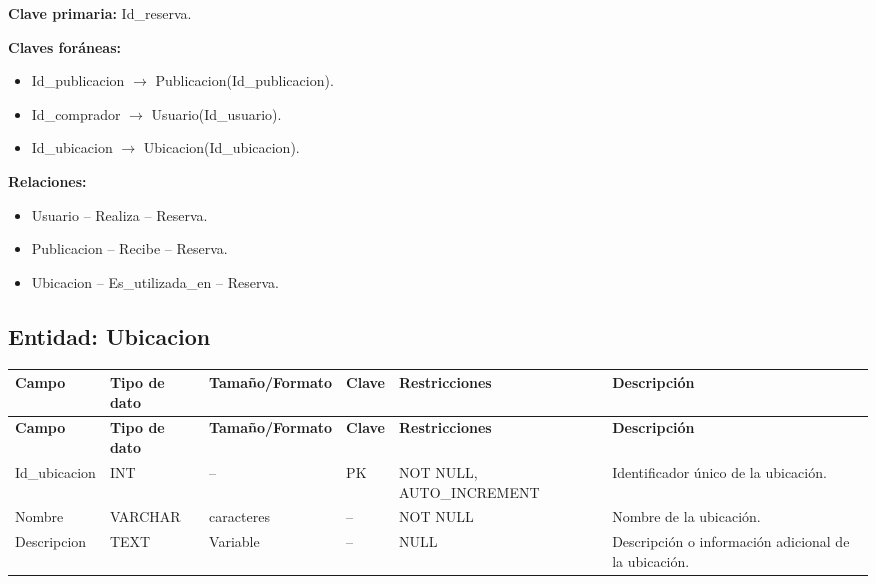 \documentclass[12pt]{article} %
\begin{document}
\textbf{Clave primaria:} Id\_reserva.

\textbf{Claves foráneas:}
\begin{itemize}
    \item Id\_publicacion $\rightarrow$ Publicacion(Id\_publicacion).
    \item Id\_comprador $\rightarrow$ Usuario(Id\_usuario).
    \item Id\_ubicacion $\rightarrow$ Ubicacion(Id\_ubicacion).
\end{itemize}

\textbf{Relaciones:}
\begin{itemize}
    \item Usuario -- Realiza -- Reserva.
    \item Publicacion -- Recibe -- Reserva.
    \item Ubicacion -- Es\_utilizada\_en -- Reserva.
\end{itemize}



\subsection{Entidad: Ubicacion}

\begin{longtable}{>{\raggedright\arraybackslash}p{2.5cm}
                  >{\raggedright\arraybackslash}p{2.0cm}
                  >{\raggedright\arraybackslash}p{2.2cm}
                  >{\raggedright\arraybackslash}p{1.2cm}
                  >{\raggedright\arraybackslash}p{3.0cm}
                  >{\raggedright\arraybackslash}p{4.0cm}}
\toprule
\textbf{Campo} &
\textbf{Tipo de dato} &
\textbf{Tamaño/Formato} &
\textbf{Clave} &
\textbf{Restricciones} &
\textbf{Descripción} \\
\midrule
\endfirsthead

\toprule
\textbf{Campo} &
\textbf{Tipo de dato} &
\textbf{Tamaño/Formato} &
\textbf{Clave} &
\textbf{Restricciones} &
\textbf{Descripción} \\
\midrule
\endhead

Id\_ubicacion &
INT &
-- &
PK &
NOT NULL, AUTO\_INCREMENT &
Identificador único de la ubicación. \\

Nombre &
VARCHAR &
100 caracteres &
-- &
NOT NULL &
Nombre de la ubicación. \\

Descripcion &
TEXT &
Variable &
-- &
NULL &
Descripción o información adicional de la ubicación. \\

\bottomrule
\end{longtable}
\end{document}
